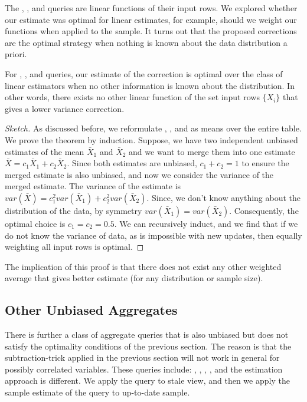 The \sumfunc, \countfunc, and \avgfunc queries are linear functions of their input rows.
We explored whether our estimate was optimal for linear estimates, for example, should we weight our functions when applied to the sample.
It turns out that the proposed corrections are the optimal strategy when nothing is known about the data distribution a priori.

\begin{theorem}
For \sumfunc, \countfunc, and \avgfunc queries, our estimate of the correction is optimal over the class of linear estimators when no other information is known about the distribution. 
In other words, there exists no other linear function of the set input rows $\{ X_i \}$ that gives a lower variance correction.
\end{theorem}
\begin{proof}[Sketch]
As discussed before, we reformulate \sumfunc, \countfunc, and \avgfunc as means over the entire table. We prove the theorem by induction. 
Suppose, we have two independent unbiased estimates of the mean $\bar{X}_1$ and $\bar{X}_2$ and we want to merge them into one estimate $\bar{X} = c_1\bar{X}_1+c_2\bar{X}_2$.
Since both estimates are unbiased, $c_1 + c_2 = 1$ to ensure the merged estimate is also unbiased, and now we consider the variance of the merged estimate.
The variance of the estimate is $var(\bar{X}) = c_1^2var(\bar{X}_1) + c_2^2var(\bar{X}_2)$.
Since, we don't know anything about the distribution of the data, by symmetry $var(\bar{X}_1) = var(\bar{X}_2)$.
Consequently, the optimal choice is $c_1=c_2=0.5$. 
We can recursively induct, and we find that if we do not know the variance of data, as is impossible with new updates, then equally weighting all input rows is optimal. 
\end{proof}
The implication of this proof is that there does not exist any other weighted average that gives better estimate (for any distribution or sample size).

\subsection{Other Unbiased Aggregates}
There is further a class of aggregate queries that is also unbiased but does not satisfy the optimality conditions of the previous section.
The reason is that the subtraction-trick applied in the previous section will not work in general for possibly correlated variables.
These queries include: \histfunc, \corrfunc, \varfunc, \covfunc, and the estimation approach is different.
We apply the query to stale view, and then we apply the sample estimate of the query to up-to-date sample.

